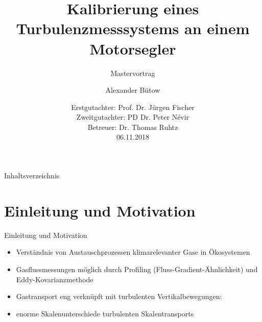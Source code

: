 \documentclass[ucs,9pt]{beamer}
\title %
{Kalibrierung eines Turbulenzmesssystems an einem Motorsegler}
\subtitle{Mastervortrag}
\author[Alexander Bütow] %
{Alexander Bütow}
\institute[FU Berlin] %
{Institut für Meteorologie, FU Berlin}
\date[6.11.2018] %
{Erstgutachter: Prof. Dr. Jürgen Fischer \\ Zweitgutachter: PD Dr. Peter Névir \\ Betreuer: Dr. Thomas Ruhtz\\[1em] 06.11.2018}
\begin{document}
\begin{frame}[plain]
  \titlepage
\end{frame}

\begin{frame}{Inhaltsverzeichnis}
  \tableofcontents
\end{frame}

\section{Einleitung und Motivation}

\begin{frame}{Einleitung und Motivation}
	\begin{itemize}
		\item<1-> Verständnis von Austauschprozessen klimarelevanter Gase in Ökosystemen
		\item<2-> Gasflussmessungen möglich durch \alert{Profiling} (Fluss-Gradient-Ähnlichkeit) und \alert{Eddy-Kovarianzmethode}
		\item<3-> Gastransport eng verknüpft mit turbulenten Vertikalbewegungen:
	\end{itemize}
	\begin{itemize}
		\item<5-> \alert{enorme Skalenunterschiede turbulenten Skalentransports}
	\end{itemize}
\end{frame}
\end{document}
